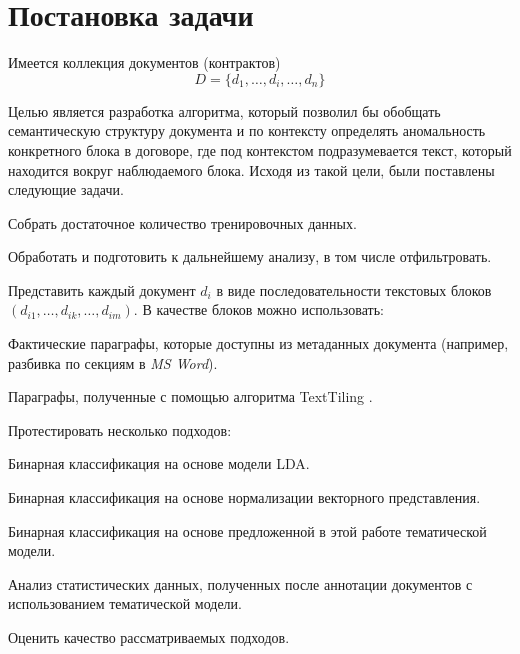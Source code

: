 \documentclass[14pt]{matmex-diploma-custom}
\begin{document}
\newpage
\section*{Постановка задачи}
Имеется коллекция документов (контрактов) $$D = \{d_1,\ldots,d_i,\ldots,d_n\}$$

Целью является разработка алгоритма, который позволил бы обобщать семантическую структуру документа и по контексту определять аномальность конкретного блока в договоре, где под контекстом подразумевается текст, который находится вокруг наблюдаемого блока. Исходя из такой цели, были поставлены следующие задачи.
\par\begin{enumerate}{
		\vspace{-0.2cm}\item Собрать достаточное количество тренировочных данных. 
		\vspace{-0.2cm}\item Обработать и подготовить к дальнейшему анализу, в том числе отфильтровать. 
		\vspace{-0.2cm}\item Представить каждый документ $d_i$ в виде последовательности текстовых блоков $(d_{i1}, \ldots, d_{ik}, \ldots, d_{im})$. В качестве блоков можно использовать:
		\par\begin{itemize}{
				\vspace{-0.2cm}\item Фактические параграфы, которые доступны из метаданных документа (например, разбивка по секциям в \textit{MS Word}).
				\vspace{-0.2cm}\item Параграфы, полученные с помощью алгоритма TextTiling  \cite{texttiling}.
		}\end{itemize}
		\vspace{-0.2cm}\item Протестировать несколько подходов:
		\par\begin{itemize}{
				\vspace{-0.2cm}\item Бинарная классификация на основе модели LDA.
				\vspace{-0.2cm}\item Бинарная классификация на основе нормализации векторного представления.
				\vspace{-0.2cm}\item Бинарная классификация на основе предложенной в этой работе тематической модели.
				\vspace{-0.2cm}\item Анализ статистических данных, полученных после аннотации документов с использованием тематической модели.
		}\end{itemize}
		\vspace{-0.2cm}\item Оценить качество рассматриваемых подходов.
}\end{enumerate}
\end{document}
